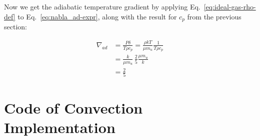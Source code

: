\documentclass[11pt]{article}
\begin{document}
\begin{appendices}
Now we get the adiabatic temperature gradient by applying Eq.~\eqref{eq:ideal-gas-rho-def} to Eq.~\eqref{eq:nabla_ad-expr}, along with the result for $c_p$ from the previous section:

\begin{align*}
    \nabla_{ad} &= \frac{P\delta}{T\rho c_p} = \frac{\rho kT}{\mu m_u} \frac{1}{T\rho c_p}\\
    &= \frac{k}{\mu m_u} \, \frac{2}{5}\frac{\mu m_u}{k} \\&= \frac{2}{5}
\end{align*}

\pagebreak
\section{Code of Convection Implementation}
\label{app:Code of Convection Implementation}




\end{appendices}

\printbibliography
\end{document}
